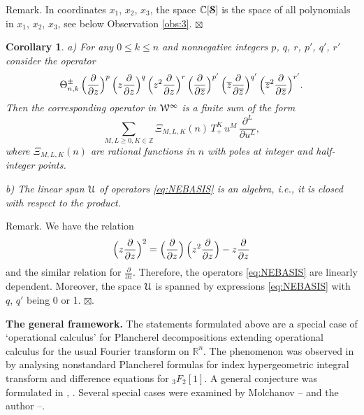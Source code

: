 \documentclass[10pt,a4paper]{amsart}
\newcounter{sec}
\newcounter{punct}[sec]
\def\punct{\refstepcounter{punct}{\arabic{sec}.\arabic{punct}.  }}
\newtheorem{corollary}[theorem]{Corollary}
\def\le{\leqslant}
\def\ge{\geqslant}
\def\cS{\boldsymbol{\EuScript S}}
\def\cU{\EuScript U}
\def\cW{\EuScript W}
\def\R {{\mathbb R }}
\def\C {{\mathbb C }}
\def\Z{{\mathbb Z}}
\def\ov{\overline}
\def\sm{\smallskip}
\begin{document}
{\sc Remark.} In coordinates $x_1$, $x_2$, $x_3$, the space $\C[\cS]$
is the space of all polynomials in $x_1$, $x_2$, $x_3$,
see below Observation \ref{obs:3}.
\hfill $\boxtimes$

\begin{corollary}
\label{cor:}
{\rm a)} For any  $0\le k\le n$ and nonnegative integers
$p$, $q$, $r$, $p'$, $q'$, $r'$ 
consider the operator
\begin{equation}
\Theta_{n,k}^\pm \, \Bigl(\frac{\partial}{\partial z}\Bigr)^p\,
\Bigl(z\frac{\partial}{\partial z}\Bigr)^q \,
\Bigl(z^2\frac{\partial}{\partial z}\Bigr)^r\,
\Bigl(\frac{\partial}{\partial \ov z}\Bigr)^{p'}\,
\Bigl(\ov z\frac{\partial}{\partial \ov z}\Bigr)^{q'} \,
\Bigl(\ov z^2\frac{\partial}{\partial \ov z}\Bigr)^{r'}.
\label{eq:NEBASIS}
\end{equation}
Then the corresponding operator in $\cW^\infty$
is a finite sum
of the form
\begin{equation}
\sum_{M,L\ge 0, K\in \Z} \Xi_{M,L,K}(n) \, T_+^K\, u^M\, \frac{\partial^L}{\partial u^L},
\label{eq:diff-diff}
\end{equation}
where $\Xi_{M,L,K}(n)$ are rational functions in $n$ with poles at
integer and half-integer points.

\sm

{\rm b)} The linear span $\cU$ of operators \eqref{eq:NEBASIS}
is an algebra, i.e., it
is closed with respect to the product.
\end{corollary}

{\sc Remark.}
We have the relation
$$ \Bigl(z\frac{\partial}{\partial z}\Bigr)^2
=
 \Bigl(\frac{\partial}{\partial z}\Bigr) \,
 \Bigl(z^2\frac{\partial}{\partial z}\Bigr)
 -
 z\frac{\partial}{\partial z}
 $$
 and the similar relation for $\frac{\partial}{\partial \ov z}$.
 Therefore, the operators \eqref{eq:NEBASIS} are linearly dependent.
 Moreover, the space $\cU$ is spanned by expressions 
 \eqref{eq:NEBASIS} with $q$, $q'$ being 0 or 1.
 \hfill $\boxtimes$.


\sm


{\bf \punct The general framework.} The statements formulated above are a special case of `operational calculus' for Plancherel decompositions extending operational calculus for the usual Fourier transform on $\R^n$. The phenomenon was observed
in \cite{Ner1} by analysing nonstandard Plancherel formulas for index hypergeometric integral transform \cite{Ner0} and difference equations for
$_3F_2[1]$. A general conjecture was formulated in \cite{Ner1}, \cite{Ner-GL2}.
Several special cases were examined by Molchanov \cite{Mol1}--\cite{Mol3} and the author \cite{Ner1}--\cite{Ner-Lob}. 
\end{document}
